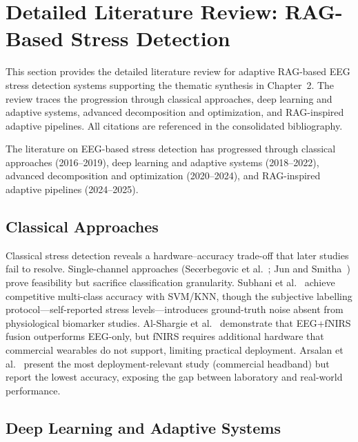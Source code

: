 
\section{Detailed Literature Review: RAG-Based Stress Detection}
\label{app:ch2_stress}
\label{sec:topic4_stress}

This section provides the detailed literature review for adaptive RAG-based EEG stress detection systems supporting the thematic synthesis in Chapter~2. The review traces the progression through classical approaches, deep learning and adaptive systems, advanced decomposition and optimization, and RAG-inspired adaptive pipelines. All citations are referenced in the consolidated bibliography.

The literature on EEG-based stress detection has progressed through classical approaches (2016--2019), deep learning and adaptive systems (2018--2022), advanced decomposition and optimization (2020--2024), and RAG-inspired adaptive pipelines (2024--2025).

\subsection{Classical Approaches}

Classical stress detection reveals a hardware--accuracy trade-off that later studies fail to resolve. Single-channel approaches (Secerbegovic et al.~\cite{secerbegovic2017workload}; Jun and Smitha~\cite{jun2016stress}) prove feasibility but sacrifice classification granularity. Subhani et al.~\cite{subhani2017stress} achieve competitive multi-class accuracy with SVM/KNN, though the subjective labelling protocol---self-reported stress levels---introduces ground-truth noise absent from physiological biomarker studies. Al-Shargie et al.~\cite{alshargie2018mental} demonstrate that EEG+fNIRS fusion outperforms EEG-only, but fNIRS requires additional hardware that commercial wearables do not support, limiting practical deployment. Arsalan et al.~\cite{arsalan2019commercial} present the most deployment-relevant study (commercial headband) but report the lowest accuracy, exposing the gap between laboratory and real-world performance.

\subsection{Deep Learning and Adaptive Systems}

